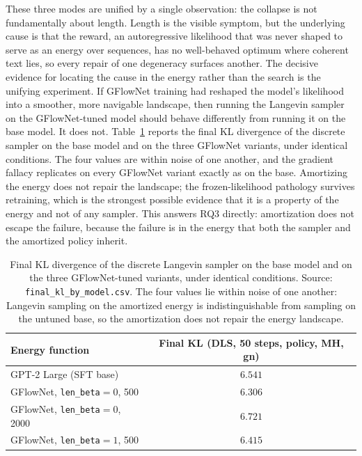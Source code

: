 These three modes are unified by a single observation: the collapse is not fundamentally about length. Length is the visible symptom, but the underlying cause is that the reward, an autoregressive likelihood that was never shaped to serve as an energy over sequences, has no well-behaved optimum where coherent text lies, so every repair of one degeneracy surfaces another. The decisive evidence for locating the cause in the energy rather than the search is the unifying experiment. If GFlowNet training had reshaped the model's likelihood into a smoother, more navigable landscape, then running the Langevin sampler on the GFlowNet-tuned model should behave differently from running it on the base model. It does not. Table~\ref{tab:gfn-unify} reports the final KL divergence of the discrete sampler on the base model and on the three GFlowNet variants, under identical conditions.
The four values are within noise of one another, and the gradient fallacy replicates on every GFlowNet variant exactly as on the base. Amortizing the energy does not repair the landscape; the frozen-likelihood pathology survives retraining, which is the strongest possible evidence that it is a property of the energy and not of any sampler. This answers RQ3 directly: amortization does not escape the failure, because the failure is in the energy that both the sampler and the amortized policy inherit.

\begin{table}[t]
    \centering
    \small
    \begin{tabular}{lc}
        \toprule
        Energy function & Final KL (DLS, 50 steps, policy, MH, gn) \\
        \midrule
        GPT-2 Large (SFT base) & $6.541$ \\
        GFlowNet, \texttt{len\_beta}$=0$, 500 & $6.306$ \\
        GFlowNet, \texttt{len\_beta}$=0$, 2000 & $6.721$ \\
        GFlowNet, \texttt{len\_beta}$=1$, 500 & $6.415$ \\
        \bottomrule
    \end{tabular}
    \caption{Final KL divergence of the discrete Langevin sampler on the base model and on the three GFlowNet-tuned variants, under identical conditions. Source: \texttt{final\_kl\_by\_model.csv}. The four values lie within noise of one another: Langevin sampling on the amortized energy is indistinguishable from sampling on the untuned base, so the amortization does not repair the energy landscape.}
    \label{tab:gfn-unify}
\end{table}

